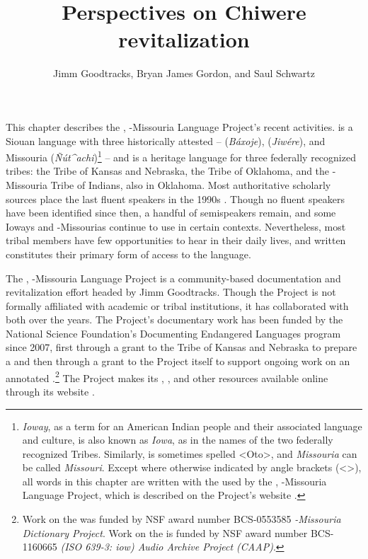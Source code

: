 \documentclass[output=paper]{LSP/langsci}
\author{Jimm Goodtracks, Bryan James Gordon, and Saul Schwartz}
\title{Perspectives on {Chiwere} revitalization}
\begin{document}
This chapter describes the , -Missouria Language Project's recent   activities.  is a Siouan language with three historically attested  --  (\emph{Báxoje}),  (\emph{Jiwére}), and Missouria (\emph{\~Nút\^{ }achi})\footnote{\emph{Ioway}, as a term for an American Indian people and their associated language and culture, is also known as \emph{Iowa}, as in the names of the two federally recognized  Tribes. Similarly, \emph{} is sometimes spelled <Oto>, and \emph{Missouria} can be called \emph{Missouri}. Except where otherwise indicated by angle brackets (<>), all  words in this chapter are written with the  used by the , -Missouria Language Project, which is described on the Project's website \citep{GoodtracksND}.} -- and is a heritage language for three federally recognized tribes: the  Tribe of Kansas and Nebraska, the  Tribe of Oklahoma, and the -Missouria Tribe of Indians, also in Oklahoma. Most authoritative scholarly sources place the last fluent  speakers in the 1990s \citep{Lewisetal2013, ParksRankin2001}. Though no fluent speakers have been identified since then, a handful of semispeakers remain, and some Ioways and -Missourias continue to use  in certain contexts. Nevertheless, most tribal members have few opportunities to hear  in their daily lives, and written  constitutes their primary form of access to the language.

The , -Missouria Language Project is a community-based  documentation and revitalization effort headed by Jimm Goodtracks. Though the Project is not formally affiliated with academic or tribal institutions, it has collaborated with both over the years. The Project's documentary work has been funded by the National Science Foundation's Documenting Endangered Languages program since 2007, first through a grant to the  Tribe of Kansas and Nebraska to prepare a  and then through a grant to the Project itself to support ongoing work on an annotated .\footnote{Work on the  was funded by NSF award number BCS-0553585 \emph{ -Missouria Dictionary Project}. Work on the  is funded by NSF award number BCS-1160665 \emph{ (ISO 639-3: iow) Audio Archive Project (CAAP)}.}  The Project makes its , , and other resources available online through its website \citep{GoodtracksND}. 
\end{document}
